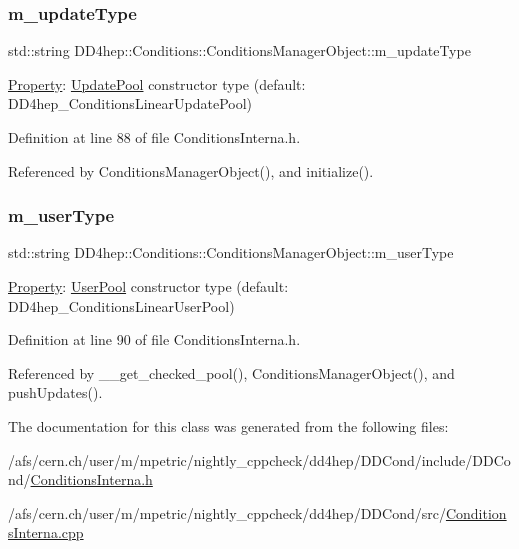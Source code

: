 \subsubsection{\texorpdfstring{m\+\_\+update\+Type}{m\_updateType}}
{\footnotesize\ttfamily std\+::string D\+D4hep\+::\+Conditions\+::\+Conditions\+Manager\+Object\+::m\+\_\+update\+Type}



\hyperlink{class_d_d4hep_1_1_property}{Property}\+: \hyperlink{class_d_d4hep_1_1_conditions_1_1_update_pool}{Update\+Pool} constructor type (default\+: D\+D4hep\+\_\+\+Conditions\+Linear\+Update\+Pool) 



Definition at line 88 of file Conditions\+Interna.\+h.



Referenced by Conditions\+Manager\+Object(), and initialize().

\hypertarget{class_d_d4hep_1_1_conditions_1_1_conditions_manager_object_abe38ba943a936b6322ec553e53f0c7dd}{}\label{class_d_d4hep_1_1_conditions_1_1_conditions_manager_object_abe38ba943a936b6322ec553e53f0c7dd} 
\subsubsection{\texorpdfstring{m\+\_\+user\+Type}{m\_userType}}
{\footnotesize\ttfamily std\+::string D\+D4hep\+::\+Conditions\+::\+Conditions\+Manager\+Object\+::m\+\_\+user\+Type}



\hyperlink{class_d_d4hep_1_1_property}{Property}\+: \hyperlink{class_d_d4hep_1_1_conditions_1_1_user_pool}{User\+Pool} constructor type (default\+: D\+D4hep\+\_\+\+Conditions\+Linear\+User\+Pool) 



Definition at line 90 of file Conditions\+Interna.\+h.



Referenced by \+\_\+\+\_\+get\+\_\+checked\+\_\+pool(), Conditions\+Manager\+Object(), and push\+Updates().



The documentation for this class was generated from the following files\+:\begin{DoxyCompactItemize}
\item 
/afs/cern.\+ch/user/m/mpetric/nightly\+\_\+cppcheck/dd4hep/\+D\+D\+Cond/include/\+D\+D\+Cond/\hyperlink{_d_d_cond_2include_2_d_d_cond_2_conditions_interna_8h}{Conditions\+Interna.\+h}\item 
/afs/cern.\+ch/user/m/mpetric/nightly\+\_\+cppcheck/dd4hep/\+D\+D\+Cond/src/\hyperlink{_d_d_cond_2src_2_conditions_interna_8cpp}{Conditions\+Interna.\+cpp}\end{DoxyCompactItemize}
